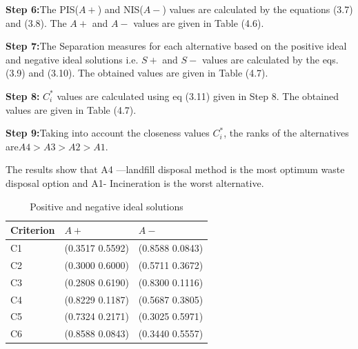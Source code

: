 \begin{flushleft}
\begin{table}[h!]
\begin{tabular}{ |p{1.5cm}|  p{1.5cm} p{1.5cm} p{1.5cm} p{1.5cm} p{1.5cm} p{1.5cm}| }
    \hline
    \end{tabular}

\label{table:1}
\end{table}
\vspace{0.3cm}
\newline
\textbf{Step 6:}The PIS($A+$) and NIS($A-$) values are calculated by the equations (3.7) and (3.8). The $A+$ and $A-$ values are given in Table (4.6).

\vspace{3mm}

\textbf{Step 7:}The Separation measures for each alternative based on the
positive ideal and negative ideal solutions i.e. $S+$ and $S-$ values are calculated by the eqs. (3.9) and (3.10). The obtained values are given in Table (4.7).

 \vspace{3mm}
 
 \textbf{Step 8:} $C_i^*$ values are calculated using eq (3.11)
given in Step 8. The obtained values are given in Table (4.7).

\vspace{3mm}

\textbf{Step 9:}Taking into account the closeness values $C_i^*$, the ranks of the
alternatives are$ A4 > A3 > A2 > A1$. 

\vspace{3mm}

The results
show that A4 —landfill disposal method
is the most optimum waste disposal option and A1- Incineration is the worst alternative.

\renewcommand{\arraystretch}{1}
\begin{table}[h!]
    \centering
     \caption{Positive and negative ideal solutions}
  \begin{tabular}{ p{1.5cm} p{3cm} p{3cm}}
  \hline
  Criterion & $A+$ & $A-$\\
  \hline
  C1 & (0.3517 0.5592) & (0.8588 0.0843)\\
C2 & (0.3000 0.6000) & (0.5711 0.3672)\\
C3 & (0.2808 0.6190) & (0.8300 0.1116)\\
C4 & (0.8229 0.1187) & (0.5687 0.3805)\\
C5 & (0.7324 0.2171) & (0.3025 0.5971)\\
C6 & (0.8588 0.0843) & (0.3440 0.5557)\\

    \hline
    \end{tabular}


\end{table}
\end{flushleft}
